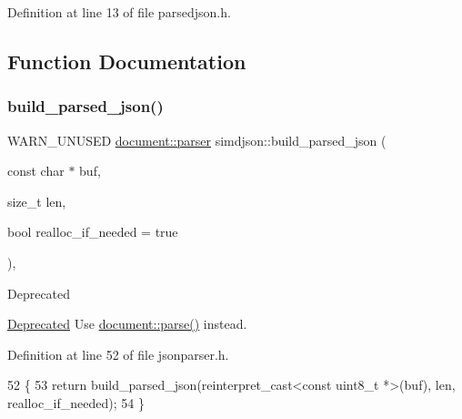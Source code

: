 Definition at line 13 of file parsedjson.\+h.



\subsection{Function Documentation}
\mbox{\label{namespacesimdjson_a810c6c6639fd9b8d7f886b2e2529b7e5}} 
\subsubsection{\texorpdfstring{build\+\_\+parsed\+\_\+json()}{build\_parsed\_json()}\hspace{0.1cm}{\footnotesize\ttfamily [1/3]}}
{\footnotesize\ttfamily W\+A\+R\+N\+\_\+\+U\+N\+U\+S\+ED \hyperlink{classsimdjson_1_1document_1_1parser}{document\+::parser} simdjson\+::build\+\_\+parsed\+\_\+json (\begin{DoxyParamCaption}\item[{const char $\ast$}]{buf,  }\item[{size\+\_\+t}]{len,  }\item[{bool}]{realloc\+\_\+if\+\_\+needed = {\ttfamily true} }\end{DoxyParamCaption})\hspace{0.3cm}{\ttfamily [inline]}, {\ttfamily [noexcept]}}

\begin{DoxyRefDesc}{Deprecated}
\item[\hyperlink{deprecated__deprecated000017}{Deprecated}]Use {\ttfamily \hyperlink{classsimdjson_1_1document_a6f11cda7c4a06fffdc00fdc97d98ae2b}{document\+::parse()}} instead.\end{DoxyRefDesc}


Definition at line 52 of file jsonparser.\+h.


\begin{DoxyCode}
52                                                                                                            
                    \{
53   \textcolor{keywordflow}{return} build\_parsed\_json(reinterpret\_cast<const uint8\_t *>(buf), len, realloc\_if\_needed);
54 \}
\end{DoxyCode}
\mbox{\label{namespacesimdjson_a2a86299a7e61f1c5ee295e8f99752653}} 
